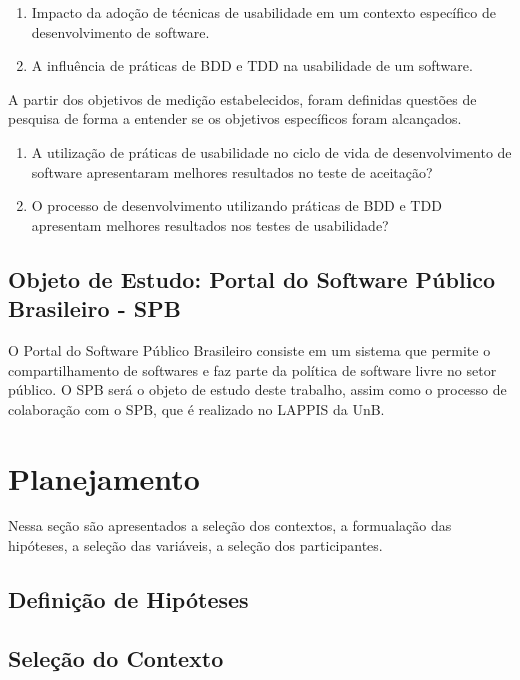 \begin{enumerate}
\item Impacto da adoção de técnicas de usabilidade em um contexto específico de desenvolvimento de software.
\item A influência de práticas de BDD e TDD na usabilidade de um software. 
\end{enumerate}

A partir dos objetivos de medição estabelecidos, foram definidas questões de pesquisa de forma a entender se os objetivos específicos foram alcançados.

\begin{enumerate}
\item A utilização de práticas de usabilidade no ciclo de vida de desenvolvimento de software apresentaram melhores resultados no teste de aceitação?
\item O processo de desenvolvimento utilizando práticas de BDD e TDD apresentam melhores resultados nos testes de usabilidade?
\end{enumerate}


\subsection{Objeto de Estudo: Portal do Software Público Brasileiro - SPB}

O Portal do Software Público Brasileiro consiste em um sistema que permite o compartilhamento de softwares e faz parte da política de software livre no setor público.
O SPB será o objeto de estudo deste trabalho, assim como o processo de colaboração com o SPB, que é realizado no LAPPIS da UnB.

\section{Planejamento}

Nessa seção são apresentados a seleção dos contextos, a formualação das hipóteses, a seleção das variáveis, a seleção dos participantes.


\subsection{Definição de Hipóteses}


\subsection{Seleção do Contexto}

